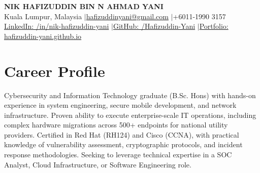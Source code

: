 \documentclass[a4paper,10pt]{article}
\begin{document}
\pagestyle{empty}

\begin{center}
    {\textbf{\huge NIK HAFIZUDDIN BIN N AHMAD YANI}}\\[6pt]
    Kuala Lumpur, Malaysia \enspace$\vert$\enspace \href{mailto:hafizuddinyani@gmail.com}{hafizuddinyani@gmail.com} \enspace$\vert$\enspace +6011-1990 3157 \\[2pt]
    \href{https://www.linkedin.com/in/nik-hafizuddin-yani-2288362a3/}{LinkedIn: /in/nik-hafizuddin-yani} \enspace$\vert$\enspace \href{https://github.com/Hafizuddin-Yani}{GitHub: /Hafizuddin-Yani} \enspace$\vert$\enspace \href{https://hafizuddin-yani.github.io}{Portfolio: hafizuddin-yani.github.io}
\end{center}

\vspace{0.8em}

\section*{Career Profile}
\noindent
Cybersecurity and Information Technology graduate (B.Sc. Hons) with hands-on experience in system engineering, secure mobile development, and network infrastructure. Proven ability to execute enterprise-scale IT operations, including complex hardware migrations across 500+ endpoints for national utility providers. Certified in Red Hat (RH124) and Cisco (CCNA), with practical knowledge of vulnerability assessment, cryptographic protocols, and incident response methodologies. Seeking to leverage technical expertise in a SOC Analyst, Cloud Infrastructure, or Software Engineering role.

\end{document}
